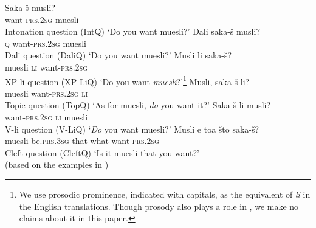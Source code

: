 \documentclass[output=paper]{langscibook}
\begin{document}

\ea
    \ea \gll Saka-š musli? \\
want-\textsc{prs.2sg} muesli \\ \hfill Intonation question (IntQ)\label{intonation}
\glt  `Do you want muesli?' \label{intoq}
    \ex \gll Dali saka-š musli? \\
\textsc{q} want-\textsc{prs.2sg} muesli \\ \hfill Dali question (DaliQ)
\glt `Do you want muesli?'  \label{dali}
    \ex \gll Musli li saka-š? \\
muesli \textsc{li} want-\textsc{prs.2sg} \\ \hfill XP-li question (XP-LiQ)\label{li}
\glt `Do you want \emph{muesli}?'\footnote{We use prosodic prominence, indicated with capitals, as the equivalent of \textit{li} in the English translations. Though prosody also plays a role in , we make no claims about it in this paper.}
    \ex \gll Musli, saka-š li? \\
muesli want-\textsc{prs.2sg} \textsc{li} \\ \hfill Topic question (TopQ)
\glt `As for muesli, \emph{do} you want it?'\label{topli}
    \ex \gll Saka-š li musli? \\
want-\textsc{prs.2sg} \textsc{li} muesli \\ \hfill V-li question (V-LiQ)
\glt `\emph{Do} you want muesli?' \label{vli}
    \ex \gll Musli e toa što saka-š? \\
muesli be.\textsc{prs.3sg} that what want-\textsc{prs.2sg} \\ \hfill Cleft question (CleftQ)
\glt `Is it muesli that you want?'\\ \label{cleft} \hfill (based on the examples in \citealt[579]{Rudin.Kramer.Billings.Baerman1999})
\z\z \label{bigli}
\end{document}
